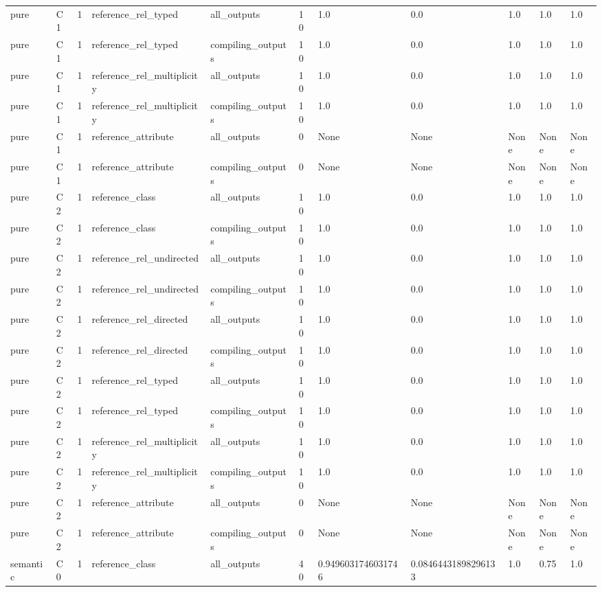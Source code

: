 \begin{tabular}{lllllllllll}
pure & C1 & 1 & reference\_rel\_typed & all\_outputs & 10 & 1.0 & 0.0 & 1.0 & 1.0 & 1.0 \\
pure & C1 & 1 & reference\_rel\_typed & compiling\_outputs & 10 & 1.0 & 0.0 & 1.0 & 1.0 & 1.0 \\
pure & C1 & 1 & reference\_rel\_multiplicity & all\_outputs & 10 & 1.0 & 0.0 & 1.0 & 1.0 & 1.0 \\
pure & C1 & 1 & reference\_rel\_multiplicity & compiling\_outputs & 10 & 1.0 & 0.0 & 1.0 & 1.0 & 1.0 \\
pure & C1 & 1 & reference\_attribute & all\_outputs & 0 & None & None & None & None & None \\
pure & C1 & 1 & reference\_attribute & compiling\_outputs & 0 & None & None & None & None & None \\
pure & C2 & 1 & reference\_class & all\_outputs & 10 & 1.0 & 0.0 & 1.0 & 1.0 & 1.0 \\
pure & C2 & 1 & reference\_class & compiling\_outputs & 10 & 1.0 & 0.0 & 1.0 & 1.0 & 1.0 \\
pure & C2 & 1 & reference\_rel\_undirected & all\_outputs & 10 & 1.0 & 0.0 & 1.0 & 1.0 & 1.0 \\
pure & C2 & 1 & reference\_rel\_undirected & compiling\_outputs & 10 & 1.0 & 0.0 & 1.0 & 1.0 & 1.0 \\
pure & C2 & 1 & reference\_rel\_directed & all\_outputs & 10 & 1.0 & 0.0 & 1.0 & 1.0 & 1.0 \\
pure & C2 & 1 & reference\_rel\_directed & compiling\_outputs & 10 & 1.0 & 0.0 & 1.0 & 1.0 & 1.0 \\
pure & C2 & 1 & reference\_rel\_typed & all\_outputs & 10 & 1.0 & 0.0 & 1.0 & 1.0 & 1.0 \\
pure & C2 & 1 & reference\_rel\_typed & compiling\_outputs & 10 & 1.0 & 0.0 & 1.0 & 1.0 & 1.0 \\
pure & C2 & 1 & reference\_rel\_multiplicity & all\_outputs & 10 & 1.0 & 0.0 & 1.0 & 1.0 & 1.0 \\
pure & C2 & 1 & reference\_rel\_multiplicity & compiling\_outputs & 10 & 1.0 & 0.0 & 1.0 & 1.0 & 1.0 \\
pure & C2 & 1 & reference\_attribute & all\_outputs & 0 & None & None & None & None & None \\
pure & C2 & 1 & reference\_attribute & compiling\_outputs & 0 & None & None & None & None & None \\
semantic & C0 & 1 & reference\_class & all\_outputs & 40 & 0.9496031746031746 & 0.08464431898296133 & 1.0 & 0.75 & 1.0 \\

\end{tabular}
